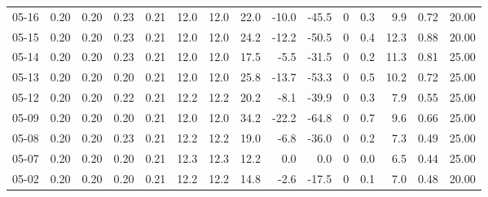 \begin{threeparttable}
{\begin{tabular}{lrrrrrrrrrrrrrr}
  05-16 &          0.20 &          0.20 &          0.23 &        0.21 &                12.0 &               12.0 &                22.0 &      -10.0 &        -45.5 &              0 &                 0.3 &              9.9 &            0.72 &                  20.00 \\
  05-15 &          0.20 &          0.20 &          0.23 &        0.21 &                12.0 &               12.0 &                24.2 &      -12.2 &        -50.5 &              0 &                 0.4 &             12.3 &            0.88 &                  20.00 \\
  05-14 &          0.20 &          0.20 &          0.23 &        0.21 &                12.0 &               12.0 &                17.5 &       -5.5 &        -31.5 &              0 &                 0.2 &             11.3 &            0.81 &                  25.00 \\
  05-13 &          0.20 &          0.20 &          0.20 &        0.21 &                12.0 &               12.0 &                25.8 &      -13.7 &        -53.3 &              0 &                 0.5 &             10.2 &            0.72 &                  25.00 \\
  05-12 &          0.20 &          0.20 &          0.22 &        0.21 &                12.2 &               12.2 &                20.2 &       -8.1 &        -39.9 &              0 &                 0.3 &              7.9 &            0.55 &                  25.00 \\
  05-09 &          0.20 &          0.20 &          0.20 &        0.21 &                12.0 &               12.0 &                34.2 &      -22.2 &        -64.8 &              0 &                 0.7 &              9.6 &            0.66 &                  25.00 \\
  05-08 &          0.20 &          0.20 &          0.23 &        0.21 &                12.2 &               12.2 &                19.0 &       -6.8 &        -36.0 &              0 &                 0.2 &              7.3 &            0.49 &                  25.00 \\
  05-07 &          0.20 &          0.20 &          0.20 &        0.21 &                12.3 &               12.3 &                12.2 &        0.0 &          0.0 &              0 &                 0.0 &              6.5 &            0.44 &                  25.00 \\
  05-02 &          0.20 &          0.20 &          0.20 &        0.21 &                12.2 &               12.2 &                14.8 &       -2.6 &        -17.5 &              0 &                 0.1 &              7.0 &            0.48 &                  20.00 \\

\end{tabular}}
\end{threeparttable}
